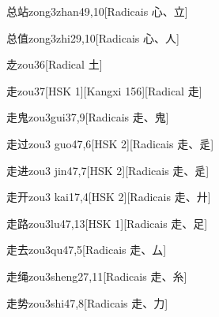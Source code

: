 \begin{entry}{总站}{zong3zhan4}{9,10}[Radicais ⼼、⽴]
\end{entry}

\begin{entry}{总值}{zong3zhi2}{9,10}[Radicais ⼼、⼈]
\end{entry}

\begin{entry}{赱}{zou3}{6}[Radical ⼟]
\end{entry}

\begin{entry}{走}{zou3}{7}[HSK 1][Kangxi 156][Radical ⾛]
\end{entry}

\begin{entry}{走鬼}{zou3gui3}{7,9}[Radicais ⾛、⿁]
\end{entry}

\begin{entry}{走过}{zou3 guo4}{7,6}[HSK 2][Radicais ⾛、⾡]
\end{entry}

\begin{entry}{走进}{zou3 jin4}{7,7}[HSK 2][Radicais ⾛、⾡]
\end{entry}

\begin{entry}{走开}{zou3 kai1}{7,4}[HSK 2][Radicais ⾛、⼶]
\end{entry}

\begin{entry}{走路}{zou3lu4}{7,13}[HSK 1][Radicais ⾛、⾜]
\end{entry}

\begin{entry}{走去}{zou3qu4}{7,5}[Radicais ⾛、⼛]
\end{entry}

\begin{entry}{走绳}{zou3sheng2}{7,11}[Radicais ⾛、⽷]
\end{entry}

\begin{entry}{走势}{zou3shi4}{7,8}[Radicais ⾛、⼒]
\end{entry}


